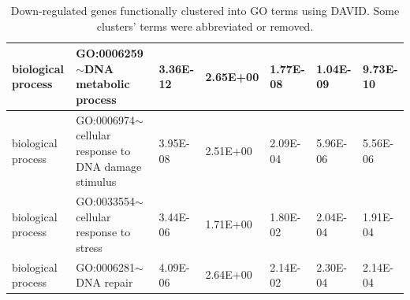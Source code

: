\documentclass{article}
\begin{document}
\begin{landscape}
\begin{table}
{\begin{tabular}{|l|l|l|l|l|l|l|}
biological process   & GO:0006259$\sim$DNA metabolic process                     & 3.36E-12 & 2.65E+00        & 1.77E-08   & 1.04E-09  & 9.73E-10 \\ \hline
biological process   & GO:0006974$\sim$cellular response to DNA damage stimulus  & 3.95E-08 & 2.51E+00        & 2.09E-04   & 5.96E-06  & 5.56E-06 \\ \hline
biological process   & GO:0033554$\sim$cellular response to stress               & 3.44E-06 & 1.71E+00        & 1.80E-02   & 2.04E-04  & 1.91E-04 \\ \hline
biological process   & GO:0006281$\sim$DNA repair                                & 4.09E-06 & 2.64E+00        & 2.14E-02   & 2.30E-04  & 2.14E-04 \\ \hline
\end{tabular}%
}
\caption{Down-regulated genes functionally clustered into GO terms using DAVID. Some clusters' terms were abbreviated or removed.}
\label{tab:downreg}
\end{table}
\end{landscape}
\end{document}
